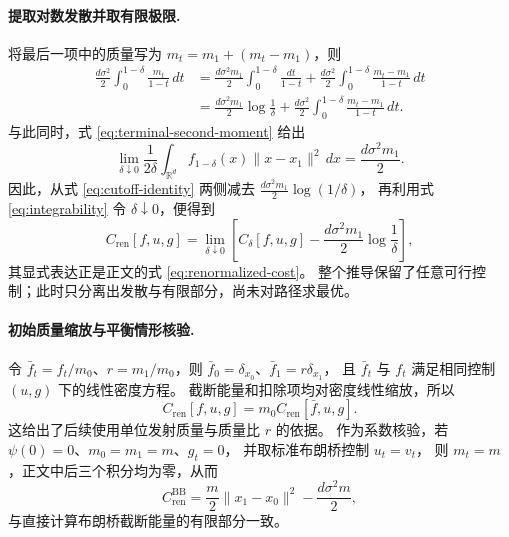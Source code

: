 \documentclass[UTF8,a4paper,11pt,fontset=fandol]{ctexart}
\begin{document}
\paragraph{提取对数发散并取有限极限.}
将最后一项中的质量写为 $m_t=m_1+(m_t-m_1)$，则
\begin{equation}
\begin{aligned}
\frac{d\sigma^2}{2}\int_0^{1-\delta}\frac{m_t}{1-t}\,dt
&=\frac{d\sigma^2m_1}{2}\int_0^{1-\delta}\frac{dt}{1-t}
+\frac{d\sigma^2}{2}\int_0^{1-\delta}\frac{m_t-m_1}{1-t}\,dt\\
&=\frac{d\sigma^2m_1}{2}\log\frac1\delta
+\frac{d\sigma^2}{2}\int_0^{1-\delta}\frac{m_t-m_1}{1-t}\,dt.
\end{aligned}
\label{eq:logarithmic-split}
\end{equation}
与此同时，式 \eqref{eq:terminal-second-moment} 给出
\begin{equation}
\lim_{\delta\downarrow0}
\frac1{2\delta}\int_{\mathbb R^d}
f_{1-\delta}(x)\|x-x_1\|^2\,dx
=\frac{d\sigma^2m_1}{2}.
\end{equation}
因此，从式 \eqref{eq:cutoff-identity} 两侧减去
$\frac{d\sigma^2m_1}{2}\log(1/\delta)$，
再利用式 \eqref{eq:integrability} 令 $\delta\downarrow0$，便得到
\begin{equation}
C_{\mathrm{ren}}[f,u,g]
=\lim_{\delta\downarrow0}
\left[
C_\delta[f,u,g]-\frac{d\sigma^2m_1}{2}\log\frac1\delta
\right],
\end{equation}
其显式表达正是正文的式 \eqref{eq:renormalized-cost}。
整个推导保留了任意可行控制；此时只分离出发散与有限部分，尚未对路径求最优。

\paragraph{初始质量缩放与平衡情形核验.}
令 $\bar f_t=f_t/m_0$、$r=m_1/m_0$，则
$\bar f_0=\delta_{x_0}$、$\bar f_1=r\delta_{x_1}$，
且 $\bar f_t$ 与 $f_t$ 满足相同控制 $(u,g)$ 下的线性密度方程。
截断能量和扣除项均对密度线性缩放，所以
\begin{equation}
C_{\mathrm{ren}}[f,u,g]
=m_0C_{\mathrm{ren}}[\bar f,u,g].
\end{equation}
这给出了后续使用单位发射质量与质量比 $r$ 的依据。
作为系数核验，若 $\psi(0)=0$、$m_0=m_1=m$、$g_t=0$，
并取标准布朗桥控制 $u_t=v_t$，
则 $m_t=m$，正文中后三个积分均为零，从而
\begin{equation}
C_{\mathrm{ren}}^{\mathrm{BB}}
=\frac{m}{2}\|x_1-x_0\|^2-\frac{d\sigma^2m}{2},
\end{equation}
与直接计算布朗桥截断能量的有限部分一致。
\end{document}
